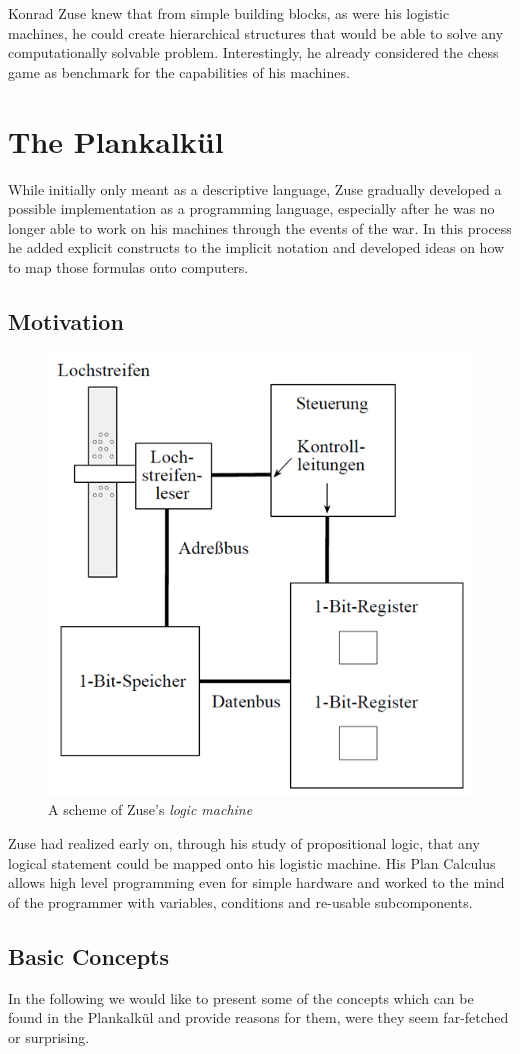 \documentclass{llncs}
\begin{document}
   Konrad Zuse knew
   that from simple building blocks, as were his logistic machines, 
   he could create hierarchical structures that would be able to solve any 
   computationally solvable problem. Interestingly, he already considered the chess game as
   benchmark for the capabilities of his machines\cite{rojas2002konrad}.
 \section{The Plankalkül}
   While initially only meant as a descriptive language, Zuse gradually 
   developed a possible implementation as a programming language, especially 
   after he was no longer able to work on his machines through the events of the war\cite{giloi2002konrad}.
   In this process he added explicit constructs to the implicit notation and developed ideas 
   on how to map those formulas onto computers\cite{rojas2002konrad}.
 \subsection{Motivation}
  \begin{figure}[bt]
    \centering
    \includegraphics[width=0.4\linewidth]{img/logicmachine.png}
    \caption{A scheme of Zuse's \emph{logic machine}\cite{rojas2002plankalkuel}}
    \label{fig:logicmachine}
  \end{figure}

   Zuse had realized early on, through his study of propositional logic, that any 
   logical statement could be mapped onto his logistic machine. His Plan Calculus
   allows high level programming even for simple hardware and worked to the mind 
   of the programmer with variables, conditions and re-usable subcomponents\cite{giloi2002konrad}.
 \subsection{Basic Concepts}
   In the following we would like to present some of 
   the concepts which can be found in the Plankalkül 
   and provide reasons for them, were they seem far-fetched 
   or surprising.
   
\end{document}

